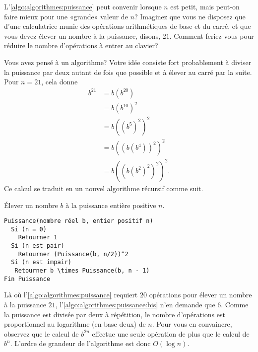 L'\autoref{algo:algorithmes:puissance} peut convenir lorsque $n$ est
petit, mais peut-on faire mieux pour une «grande» valeur de $n$?
Imaginez que vous ne disposez que d'une calculatrice munie des
opérations arithmétiques de base et du carré, et que vous devez élever
un nombre à la puissance, disons, $21$. Comment feriez-vous pour
réduire le nombre d'opérations à entrer au clavier?


Vous avez pensé à un algorithme? Votre idée consiste fort probablement
à diviser la puissance par deux autant de fois que possible et à
élever au carré par la suite. Pour $n = 21$, cela donne
\begin{align*}
  b^{21}
  &= b (b^{20}) \\
  & = b (b^{10})^2 \\
  &= b ((b^5)^2)^2 \\
  & = b ((b (b^4))^2)^2 \\
  &= b ((b (b^2)^2)^2)^2.
\end{align*}
Ce calcul se traduit en un nouvel algorithme récursif comme suit.

\begin{algorithmebis}
  \label{algo:algorithmes:puissance:bis}
  Élever un nombre $b$ à la puissance entière positive $n$.
  \begin{Schunk}
\begin{Verbatim}[commandchars=\\\{\}]
Puissance(nombre réel b, entier positif n)
  Si (n = 0)
    Retourner 1
  Si (n est pair)
    Retourner (Puissance(b, n/2))^2
  Si (n est impair)
   Retourner b \times Puissance(b, n - 1)
Fin Puissance
\end{Verbatim}
  \end{Schunk}
\end{algorithmebis}

Là où l'\autoref{algo:algorithmes:puissance} requiert $20$ opérations
pour élever un nombre à la puissance $21$,
l'\autoref{algo:algorithmes:puissance:bis} n'en demande que $6$. Comme
la puissance est divisée par deux à répétition, le nombre d'opérations
est proportionnel au logarithme (en base deux) de $n$. Pour vous en
convaincre, observez que le calcul de $b^{2n}$ effectue une seule
opération de plus que le calcul de $b^n$. L'ordre de grandeur de
l'algorithme est donc $O(\log n)$.

